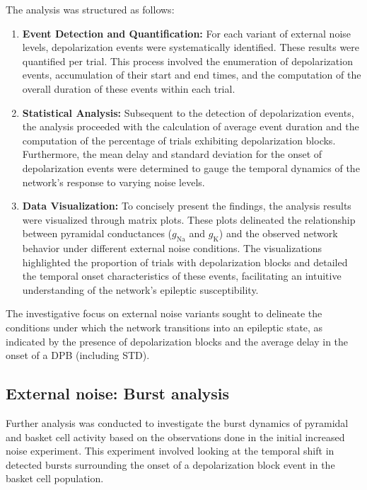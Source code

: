 \noindent The analysis was structured as follows:
\begin{enumerate}
    \item \textbf{Event Detection and Quantification:} For each variant of external noise levels, depolarization events were systematically identified. These results were quantified per trial. This process involved the enumeration of depolarization events, accumulation of their start and end times, and the computation of the overall duration of these events within each trial.

    \item \textbf{Statistical Analysis:} Subsequent to the detection of depolarization events, the analysis proceeded with the calculation of average event duration and the computation of the percentage of trials exhibiting depolarization blocks. Furthermore, the mean delay and standard deviation for the onset of depolarization events were determined to gauge the temporal dynamics of the network's response to varying noise levels.

    \item \textbf{Data Visualization:} To concisely present the findings, the analysis results were visualized through matrix plots. These plots delineated the relationship between pyramidal conductances (\(g_{\text{Na}}\) and \(g_{\text{K}}\)) and the observed network behavior under different external noise conditions. The visualizations highlighted the proportion of trials with depolarization blocks and detailed the temporal onset characteristics of these events, facilitating an intuitive understanding of the network's epileptic susceptibility.
\end{enumerate}

\noindent The investigative focus on external noise variants sought to delineate
the conditions under which the network transitions into an epileptic state, as indicated by the
presence of depolarization blocks and the average delay in the onset of a DPB (including STD).
\pagebreak
\subsection{External noise: Burst analysis}
Further analysis was conducted to investigate the burst dynamics of pyramidal
and basket cell activity based on the observations done in the initial
increased noise experiment. This experiment involved looking at the temporal
shift in detected bursts surrounding the onset of a depolarization block event
in the basket cell population.

